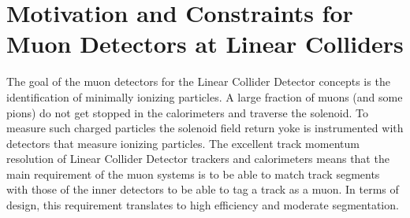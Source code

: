 \section{Motivation and Constraints for Muon Detectors at Linear Colliders}

The goal of the muon detectors for the Linear Collider Detector concepts is the identification of minimally ionizing particles. A large fraction of muons (and some pions) do not get stopped in the calorimeters and traverse the solenoid. To measure such charged particles the solenoid field return yoke is instrumented with detectors that measure ionizing particles. The excellent track momentum resolution of Linear Collider Detector trackers and calorimeters means that the main requirement of the muon systems is to be able to match track segments with those of the inner detectors to be able to tag a track as a muon. In terms of design, this requirement translates to high efficiency and moderate segmentation.
